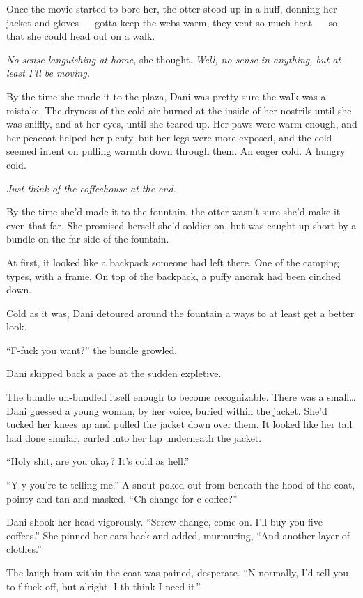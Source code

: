 Once the movie started to bore her, the otter stood up in a huff, donning her jacket and gloves --- gotta keep the webs warm, they vent so much heat --- so that she could head out on a walk.

\emph{No sense languishing at home,} she thought. \emph{Well, no sense in anything, but at least I'll be moving.}

By the time she made it to the plaza, Dani was pretty sure the walk was a mistake. The dryness of the cold air burned at the inside of her nostrils until she was sniffly, and at her eyes, until she teared up. Her paws were warm enough, and her peacoat helped her plenty, but her legs were more exposed, and the cold seemed intent on pulling warmth down through them. An eager cold. A hungry cold.

\emph{Just think of the coffeehouse at the end.}

By the time she'd made it to the fountain, the otter wasn't sure she'd make it even that far. She promised herself she'd soldier on, but was caught up short by a bundle on the far side of the fountain.

At first, it looked like a backpack someone had left there. One of the camping types, with a frame. On top of the backpack, a puffy anorak had been cinched down.

Cold as it was, Dani detoured around the fountain a ways to at least get a better look.

``F-fuck you want?'' the bundle growled.

Dani skipped back a pace at the sudden expletive.

The bundle un-bundled itself enough to become recognizable. There was a small\ldots{}Dani guessed a young woman, by her voice, buried within the jacket. She'd tucked her knees up and pulled the jacket down over them. It looked like her tail had done similar, curled into her lap underneath the jacket.

``Holy shit, are you okay? It's cold as hell.''

``Y-y-you're te-telling me.'' A snout poked out from beneath the hood of the coat, pointy and tan and masked. ``Ch-change for c-coffee?''

Dani shook her head vigorously. ``Screw change, come on. I'll buy you five coffees.'' She pinned her ears back and added, murmuring, ``And another layer of clothes.''

The laugh from within the coat was pained, desperate. ``N-normally, I'd tell you to f-fuck off, but alright. I th-think I need it.''

